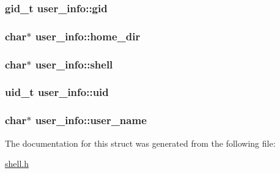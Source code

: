 \subsubsection[{\texorpdfstring{gid}{gid}}]{\setlength{\rightskip}{0pt plus 5cm}gid\+\_\+t user\+\_\+info\+::gid}\hypertarget{structuser__info_a99413c55942db77ae3cf544bb82f6af7}{}\label{structuser__info_a99413c55942db77ae3cf544bb82f6af7}
\subsubsection[{\texorpdfstring{home\+\_\+dir}{home_dir}}]{\setlength{\rightskip}{0pt plus 5cm}char$\ast$ user\+\_\+info\+::home\+\_\+dir}\hypertarget{structuser__info_a862cf8cbf50b91c8b52fdf0fb00c461d}{}\label{structuser__info_a862cf8cbf50b91c8b52fdf0fb00c461d}
\subsubsection[{\texorpdfstring{shell}{shell}}]{\setlength{\rightskip}{0pt plus 5cm}char$\ast$ user\+\_\+info\+::shell}\hypertarget{structuser__info_a35b196ef8d0bbd4329645dac6d3d48be}{}\label{structuser__info_a35b196ef8d0bbd4329645dac6d3d48be}
\subsubsection[{\texorpdfstring{uid}{uid}}]{\setlength{\rightskip}{0pt plus 5cm}uid\+\_\+t user\+\_\+info\+::uid}\hypertarget{structuser__info_a336097610439e04eccd63acef69443de}{}\label{structuser__info_a336097610439e04eccd63acef69443de}
\subsubsection[{\texorpdfstring{user\+\_\+name}{user_name}}]{\setlength{\rightskip}{0pt plus 5cm}char$\ast$ user\+\_\+info\+::user\+\_\+name}\hypertarget{structuser__info_abecea7d4c564b4b56c985c3e450f9e62}{}\label{structuser__info_abecea7d4c564b4b56c985c3e450f9e62}


The documentation for this struct was generated from the following file\+:\begin{DoxyCompactItemize}
\item 
\hyperlink{shell_8h}{shell.\+h}\end{DoxyCompactItemize}
